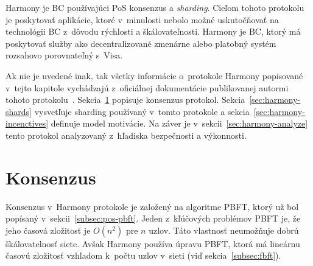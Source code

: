 Harmony je BC používajúci PoS konsenzus a \textit{sharding}. Cieľom tohoto protokolu je poskytovať aplikácie, ktoré v~minulosti nebolo možné uskutočňovať na technológii BC z~dôvodu rýchlosti a škálovateľnosti. Harmony je BC, ktorý má poskytovať služby ako decentralizované zmenárne alebo platobný systém rozsahovo porovnateľný s~Visa.

Ak nie je uvedené inak, tak všetky informácie o~protokole Harmony popisované v~tejto kapitole vychádzajú z~oficiálnej dokumentácie publikovanej autormi tohoto protokolu~\cite{harmonyWp, harmonyDoc}. Sekcia~\ref{sec:harmony-cons} popisuje konsenzus protokol. Sekcia~\ref{sec:harmony-shards} vysvetľuje sharding používaný v~tomto protokole a sekcia~\ref{sec:harmony-incenctives} definuje model motivácie. Na záver je v~sekcii~\ref{sec:harmony-analyze} tento protokol analyzovaný z~hľadiska bezpečnosti a výkonnosti.

\section{Konsenzus}\label{sec:harmony-cons}

Konsenzus v~Harmony protokole je založený na algoritme PBFT, ktorý už bol popísaný v~sekcii~\ref{subsec:pos-pbft}. Jeden z~kľúčových problémov PBFT je, že jeho časová zložitosť je $O(n^2)$ pre $n$ uzlov. Táto vlastnosť neumožňuje dobrú škálovatelnosť siete. Avšak Harmony používa úpravu PBFT, ktorá má lineárnu časovú zložitosť vzhľadom k~počtu uzlov v~sieti (viď sekcia~\ref{subsec:fbft}).

